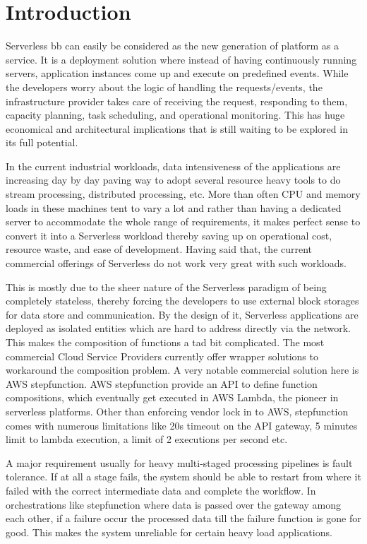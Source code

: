 \documentclass[12pt,titlepage]{article}
\begin{document}
\section{Introduction}
\label{sec:orgce64edd}

Serverless \cite{bayliss09:_rollin_out_revol} bb can easily be considered as the new generation of platform as a  
service. It is a deployment solution where instead of having continuously
running servers, application instances come up and execute on predefined events.
While the developers worry about
the logic of handling the requests/events, the infrastructure provider takes
care of receiving the request, responding to them, capacity planning, task
scheduling, and operational monitoring\cite{gotoconf}.
This has huge economical and architectural implications that is
still waiting to be explored in its full potential. 

In the current industrial workloads, data intensiveness of the applications are increasing
day by day paving way to adopt several resource heavy tools to do stream
processing, distributed processing, etc. More than often CPU and memory loads in
these machines tent to vary a lot and rather than having a dedicated server to accommodate the whole range
of requirements, it makes perfect sense to convert it into a Serverless workload
thereby saving up on operational cost, resource waste, and ease of development.
Having said that, the current commercial offerings of Serverless do not work
very great with such workloads.

This is mostly due to the sheer
nature of the Serverless paradigm of being completely stateless, thereby forcing
the developers to use external block storages for data store and communication.
By the design of it, Serverless applications are deployed as isolated entities
which are hard to address directly via the network. This makes the composition
of functions a tad bit complicated. The most commercial Cloud Service Providers
currently offer wrapper solutions to workaround the composition problem. A very
notable commercial solution here is AWS stepfunction. AWS stepfunction provide
an API to define function compositions, which eventually get executed in AWS
Lambda, the pioneer in serverless platforms. Other than enforcing vendor lock in
to AWS, stepfunction comes with numerous limitations like 20s timeout on the API
gateway, 5 minutes limit to lambda execution, a limit of 2 executions per second
etc.

A major requirement usually for heavy multi-staged processing pipelines is fault
tolerance. If at all a stage fails, the system should be able to restart from
where it failed with the correct intermediate data and complete the workflow. In
orchestrations like stepfunction where data is passed over the gateway among
each other, if a failure occur the processed data till the failure function is
gone for good. This makes the system unreliable for certain heavy load applications.
\end{document}
